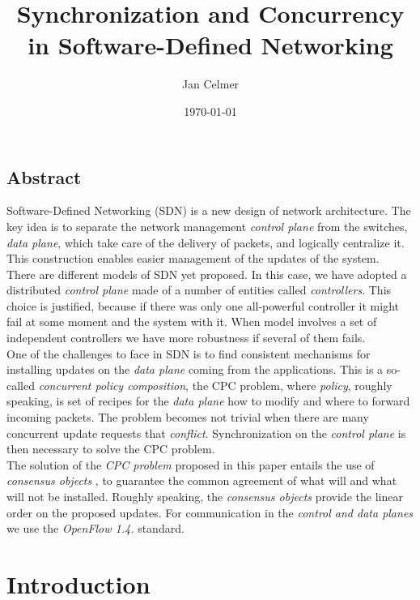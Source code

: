 \documentclass{article}
\title{Synchronization and Concurrency in Software-Defined Networking}
\author{Jan Celmer}
\date{\today}
\begin{document}
\maketitle

\subsection*{Abstract} Software-Defined Networking (SDN) is a new design of network architecture. The key idea is to separate  the network management \emph{control plane} from the switches, \emph{data plane}, which take care of the delivery of packets, and logically centralize it.    \\
This construction enables easier management of the updates of the system.\\

There are different models of SDN yet proposed. In this case, we have adopted a distributed \emph{control plane} made of a number of entities called \emph{controllers}. This choice is justified, because if there was only one all-powerful controller it might fail at some moment and the system with it. When model involves a set of independent controllers we have more robustness if several of them fails.
\\
One of the challenges to face in SDN is to find consistent mechanisms for installing updates on the \emph{data plane} coming from the applications. This is a so-called \emph{concurrent policy composition}, the CPC problem, where \emph{policy}, roughly speaking, is set of recipes for the \emph{data plane} how to modify and where to forward incoming packets. The problem becomes not trivial when there are many concurrent update requests that \emph{conflict}. Synchronization on the \emph{control plane} is then necessary to solve the CPC problem. 
\\
 The solution of the \emph{CPC problem} proposed in this paper entails the use of \emph{consensus objects} , to guarantee the common agreement of what will and what will not be installed. Roughly speaking, the \emph{consensus objects} provide the linear order on the proposed updates. For communication in the \emph{control and data planes} we use the \emph{OpenFlow 1.4.} standard.
\section{Introduction}
\end{document}
